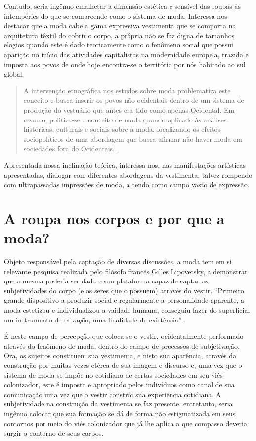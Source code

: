 \begin{refsection}
    Contudo, seria ingênuo emalhetar a dimensão estética e sensível das roupas às intempéries do que se compreende como o sistema de moda. Interessa-nos destacar que a moda cabe a gama expressiva vestimenta que se comporta na arquitetura têxtil do cobrir o corpo, a própria não se faz digna de tamanhos elogios quando este é dado teoricamente como o fenômeno social que possui aparição no início das atividades capitalistas na modernidade europeia, trazida e imposta aos povos de onde hoje encontra-se o território por nós habitado ao sul global.  

    \begin{quotation}
        A intervenção etnográfica nos estudos sobre moda problematiza este conceito e busca inserir os povos não ocidentais dentro de um sistema de produção do vestuário que antes era tido como apenas Ocidental. Em resumo, politiza-se o conceito de moda quando aplicado às análises históricas, culturais e sociais sobre a moda, localizando os efeitos sociopolíticos de uma abordagem que busca afirmar não haver moda em sociedades fora do Ocidentais. \cite[p.~16]{Santos2020Analise}.
    \end{quotation}

    Apresentada nossa inclinação teórica, interessa-nos, nas manifestações artísticas apresentadas, dialogar com diferentes abordagens da vestimenta, talvez rompendo com ultrapassadas impressões de moda, a tendo como campo vasto de expressão.

    \section{A roupa nos corpos e por que a moda?}

    Objeto responsável pela captação de diversas discussões, a moda tem em si relevante pesquisa realizada pelo filósofo francês Gilles Lipovetsky, a demonstrar que a mesma poderia ser dada como plataforma capaz de captar as subjetividades do corpo (e os seres que o possuem) através do vestir. ``Primeiro grande dispositivo a produzir social e regularmente a personalidade aparente, a moda estetizou e individualizou a vaidade humana, conseguiu fazer do superficial um instrumento de salvação, uma finalidade de existência'' \cite[p.~39]{Lipovetsky1989Imperio}.

    É neste campo de percepção que coloca-se o vestir, ocidentalmente performado através do fenômeno de moda, dentro do campo de processos de subjetivação. Ora, os sujeitos constituem sua vestimenta, e nisto sua aparência, através da construção por muitas vezes etérea de sua imagem e discurso e, uma vez que o sistema de moda se impõe no cotidiano de certas sociedades em seu viés colonizador, este é imposto e apropriado pelos indivíduos como canal de sua comunicação uma vez que o vestir constrói sua experiência cotidiana. A subjetividade na construção da vestimenta se faz presente, entretanto, seria ingênuo colocar que sua formação se dá de forma não estigmatizada em seus contornos por meio do viés colonizador que já lhe aplica a que compasso deveria surgir o contorno de seus corpos. 


\end{refsection}
